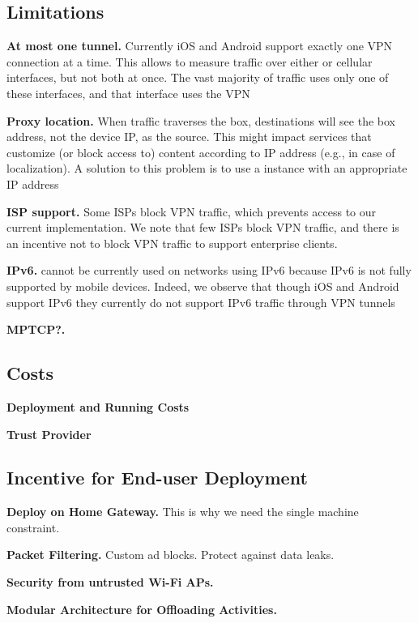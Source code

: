 \subsection{Limitations}

\noindent\textbf{At most one tunnel.}
Currently iOS and Android support exactly one VPN connection at a time. 
This allows \meddle{} to measure traffic over either \wifi or cellular interfaces, but not both at once.
The vast majority of traffic uses only one of these interfaces, and that interface uses the VPN

\noindent\textbf{Proxy location.} 
When traffic traverses the \meddle{} box, destinations will see the \meddle{} box address, not the device IP, as the source. 
This might impact services  that customize (or block access to) content according to IP address (e.g., in case of localization). 
A solution to this problem is to use a \meddle{} instance with an appropriate IP address

\noindent\textbf{ISP support.}
Some ISPs block VPN traffic, which prevents access to our current \meddle implementation. 
We note that few ISPs block VPN traffic, and there is an incentive not to block VPN traffic to support enterprise clients.

\noindent\textbf{IPv6.}
\meddle{} cannot be currently used on networks using IPv6 because IPv6 is not fully supported by mobile devices. 
Indeed, we observe that though iOS and Android support IPv6 they currently do not support IPv6 traffic through VPN tunnels

\noindent\textbf{MPTCP?.}


\subsection{Costs}

\noindent\textbf{Deployment and Running Costs}

\noindent\textbf{Trust Provider}

\subsection{Incentive for End-user Deployment}

\noindent \textbf{Deploy on Home Gateway.}
This is why we need the single machine constraint. 

\noindent \textbf{Packet Filtering.}
Custom ad blocks. Protect against data leaks. 

\noindent \textbf{Security from untrusted Wi-Fi APs.}

\noindent \textbf{Modular Architecture for Offloading Activities.}

